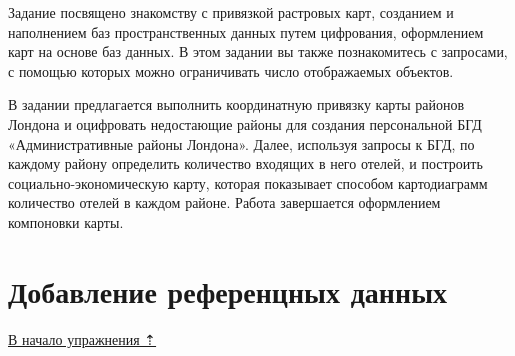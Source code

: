 \documentclass[12pt,]{book}
\begin{document}
Задание посвящено знакомству с привязкой растровых карт, созданием и наполнением баз пространственных данных путем цифрования, оформлением карт на основе баз данных. В этом задании вы также познакомитесь с запросами, с помощью которых можно ограничивать число отображаемых объектов.

В задании предлагается выполнить координатную привязку карты районов Лондона и оцифровать недостающие районы для создания персональной БГД «Административные районы Лондона». Далее, используя запросы к БГД, по каждому району определить количество входящих в него отелей, и построить социально-экономическую карту, которая показывает способом картодиаграмм количество отелей в каждом районе. Работа завершается оформлением компоновки карты.

\hypertarget{map-ref-economic-reference}{%
\section{Добавление референцных данных}\label{map-ref-economic-reference}}

\protect\hyperlink{map-ref-economic}{В начало упражнения ⇡}
\end{document}
